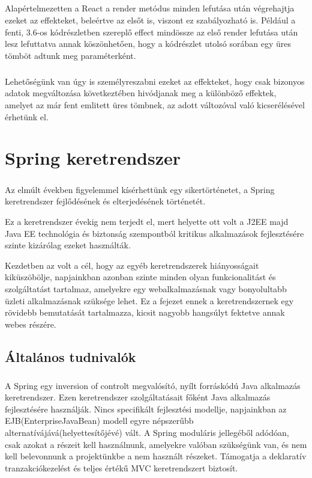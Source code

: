 \paragraph{}
Alapértelmezetten a React a render metódus minden lefutása után végrehajtja ezeket az effekteket, beleértve az elsőt is, viszont ez szabályozható is. Például a fenti, 3.6-os kódrészletben szereplő effect mindössze az első render lefutása után lesz lefuttatva annak köszönhetően, hogy a kódrészlet utolsó sorában egy üres tömböt adtunk meg paraméterként.

\paragraph{}
Lehetőségünk van úgy is személyreszabni ezeket az effekteket, hogy csak bizonyos adatok megváltozása következtében hivódjanak meg a különböző effektek, amelyet az már fent emlitett üres tömbnek, az adott változóval való kicserélésével érhetünk el.

\chapter{Spring keretrendszer}\label{ch:progik}
\paragraph{}
Az elmúlt években figyelemmel kísérhettünk egy sikertörténetet, a Spring keretrendszer fejlődésének és elterjedésének történetét. 

Ez a keretrendszer évekig nem terjedt el, mert helyette ott volt a J2EE majd Java EE technológia és biztonság szempontból kritikus alkalmazások fejlesztésére szinte kizárólag ezeket használták. 

Kezdetben az volt a cél, hogy az egyéb keretrendszerek hiányosságait kiküszöbölje, napjainkban azonban szinte minden olyan funkcionalitást és szolgáltatást tartalmaz, amelyekre egy webalkalmazásnak vagy bonyolultabb üzleti alkalmazásnak szüksége lehet. Ez a fejezet ennek a keretrendszernek egy rövidebb bemutatását tartalmazza, kicsit nagyobb hangsúlyt fektetve annak webes részére.

\section{Általános tudnivalók}
\paragraph{}
A Spring egy inversion of controlt megvalósító, nyílt forráskódú Java alkalmazás keretrendszer. Ezen keretrendszer szolgáltatásait főként Java alkalmazás fejlesztésére használják. Nincs specifikált fejlesztési modellje, napjainkban az EJB(EnterpriseJavaBean) modell egyre népszerűbb alternatívájává(helyettesítőjévé) vált. A Spring moduláris jellegéből adódóan, csak azokat a részeit kell használnunk, amelyekre valóban szükségünk van, és nem kell belevonnunk a projektünkbe a nem használt részeket. Támogatja a deklaratív tranzakciókezelést és teljes értékű MVC keretrendszert biztosít.

